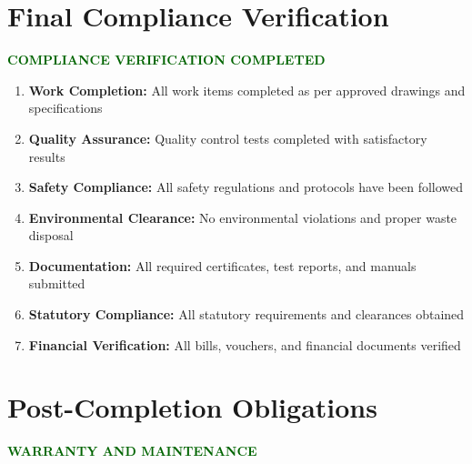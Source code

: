 \documentclass[12pt,a4paper]{article}
\newcommand{\checkbox}{\makebox[1em]{$\boxtimes$}}
\begin{document}
\begin{center}
{\begin{minipage}{0.95\textwidth}
\vspace{1cm}
\section*{Final Compliance Verification}

\begin{center}
\colorbox{lightgray!50}{\begin{minipage}{0.9\textwidth}
\textbf{\textcolor{darkgreen}{COMPLIANCE VERIFICATION COMPLETED}}

\vspace{0.5cm}
\begin{enumerate}[leftmargin=1cm]
\item \checkbox \textbf{Work Completion:} All work items completed as per approved drawings and specifications

\item \checkbox \textbf{Quality Assurance:} Quality control tests completed with satisfactory results

\item \checkbox \textbf{Safety Compliance:} All safety regulations and protocols have been followed

\item \checkbox \textbf{Environmental Clearance:} No environmental violations and proper waste disposal

\item \checkbox \textbf{Documentation:} All required certificates, test reports, and manuals submitted

\item \checkbox \textbf{Statutory Compliance:} All statutory requirements and clearances obtained

\item \checkbox \textbf{Financial Verification:} All bills, vouchers, and financial documents verified
\end{enumerate}
\end{minipage}}
\end{center}

\vspace{1cm}
\section*{Post-Completion Obligations}

\begin{center}
\colorbox{certgold!20}{\begin{minipage}{0.9\textwidth}
\begin{center}
\textbf{\textcolor{darkgreen}{WARRANTY AND MAINTENANCE}}
\end{center}


\end{minipage}}
\end{center}
\end{minipage}}
\end{center}
\end{document}
